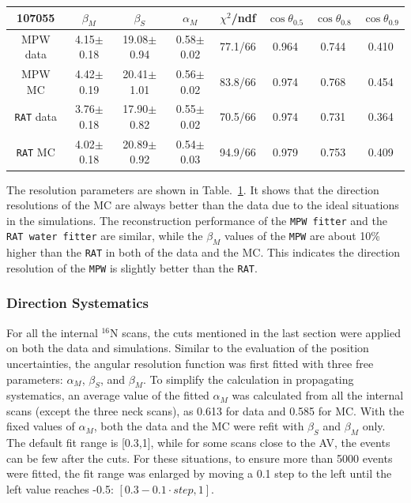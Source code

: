 \begin{table}[ht]
	\begin{tabular}{cccccccc}%
		\toprule
	107055& $\beta_M$ &  $\beta_S$ & $\alpha_M$ & $\chi^2$/ndf & $\cos\theta_{0.5}$ & $\cos\theta_{0.8}$& $\cos\theta_{0.9}$\\
	\hline
	MPW data & 4.15$\pm$0.18 & 19.08$\pm$0.94 & 0.58$\pm$0.02 & 77.1/66 & 0.964 & 0.744 & 0.410 \\
	MPW MC & 4.42$\pm$0.19 & 20.41$\pm$1.01 & 0.56$\pm$0.02 & 83.8/66 & 0.974 & 0.768 & 0.454	 \\	
\hline
	\texttt{RAT} data & 3.76$\pm$0.18 & 17.90$\pm$0.82 & 0.55$\pm$0.02 & 70.5/66 & 0.974 & 0.731 & 0.364 \\
	\texttt{RAT} MC & 4.02$\pm$0.18 & 20.89$\pm$0.92 & 0.54$\pm$0.03 & 94.9/66 & 0.979 & 0.753 & 0.409	\\
		\bottomrule
	\end{tabular}
	\label{tab:angularResolValuesUpdated}
\end{table}

The resolution parameters are shown in Table.~\ref{tab:angularResolValuesUpdated}. It shows that the direction resolutions of the MC are always better than the data due to the ideal situations in the simulations. The reconstruction performance of the \texttt{MPW fitter} and the \texttt{RAT water fitter} are similar, while the $\beta_M$ values of the \texttt{MPW} are about 10\% higher than the \texttt{RAT} in both of the data and the MC. This indicates the direction resolution of the \texttt{MPW} is slightly better than the \texttt{RAT}.

\subsubsection{Direction Systematics}
For all the internal $^{16}$N scans, the cuts mentioned in the last section were applied on both the data and simulations. Similar to the evaluation of the position uncertainties, the angular resolution function was first fitted with three free parameters: $\alpha_M$, $\beta_S$, and $\beta_M$. To simplify the calculation in propagating systematics, an average value of the fitted $\alpha_M$ was calculated from all the internal scans (except the three neck scans), as 0.613 for data and 0.585 for MC. With the fixed values of $\alpha_M$, both the data and the MC were refit with $\beta_S$ and $\beta_M$ only. The default fit range is [0.3,1], while for some scans close to the AV, the events can be few after the cuts. For these situations, to ensure more than 5000 events were fitted, the fit range was enlarged by moving a 0.1 step to the left until the left value reaches -0.5: $[0.3-0.1\cdot step,1]$.

